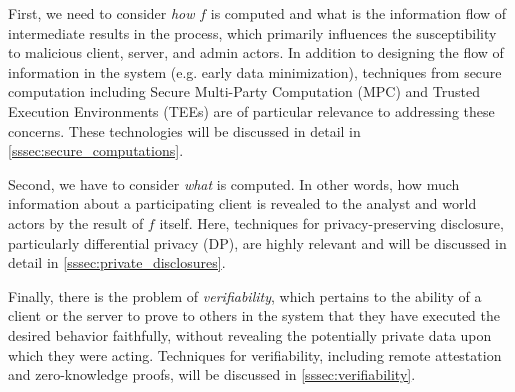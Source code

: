 First, we need to consider {\em how} $f$ is computed and what is the information flow of intermediate results in the process, which primarily influences the susceptibility to malicious client, server, and admin actors.  In addition to designing the flow of information in the system (e.g. early data minimization), techniques from secure computation including Secure Multi-Party Computation (MPC) and Trusted Execution Environments (TEEs) are of particular relevance to addressing these concerns.  These technologies will be discussed in detail in \cref{sssec:secure_computations}.

Second, we have to consider {\em what} is computed. In other words, how much information about a participating client is revealed to the analyst and world actors by the result of $f$ itself. Here, techniques for privacy-preserving disclosure, particularly differential privacy (DP), are highly relevant and will be discussed in detail in \cref{sssec:private_disclosures}.

Finally, there is the problem of {\em verifiability}, which pertains to the ability of a client or the server to prove to others in the system that they have executed the desired behavior faithfully, without revealing the potentially private data upon which they were acting.  Techniques for verifiability, including remote attestation and zero-knowledge proofs, will be discussed in \cref{sssec:verifiability}.

